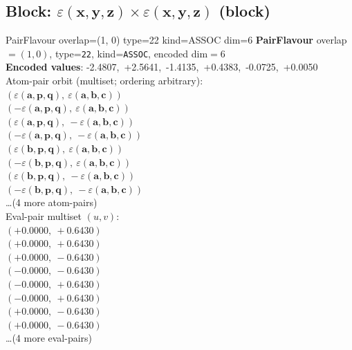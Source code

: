 \documentclass[a4paper,11pt]{article}
\newcommand{\kblbmcpggoncpf}[3]{\varepsilon(\mathbf{#1},\mathbf{#2},\mathbf{#3})}
\begin{document}
\subsection{Block: $\kblbmcpggoncpf{x}{y}{z} \times \kblbmcpggoncpf{x}{y}{z}$  (block)}
    PairFlavour  overlap=(1, 0)  type=22  kind=ASSOC  dim=6
\textbf{PairFlavour} overlap$=(1, 0)$, type=\texttt{22}, kind=\texttt{ASSOC}, encoded dim$=6$\\
\textbf{      Encoded values}: -2.4807,\ +2.5641,\ -1.4135,\ +0.4383,\ -0.0725,\ +0.0050\\
\quad Atom-pair orbit (multiset; ordering arbitrary):\\
$(\kblbmcpggoncpf{a}{p}{q},\ \kblbmcpggoncpf{a}{b}{c})$\\
$(-\kblbmcpggoncpf{a}{p}{q},\ \kblbmcpggoncpf{a}{b}{c})$\\
$(\kblbmcpggoncpf{a}{p}{q},\ -\kblbmcpggoncpf{a}{b}{c})$\\
$(-\kblbmcpggoncpf{a}{p}{q},\ -\kblbmcpggoncpf{a}{b}{c})$\\
$(\kblbmcpggoncpf{b}{p}{q},\ \kblbmcpggoncpf{a}{b}{c})$\\
$(-\kblbmcpggoncpf{b}{p}{q},\ \kblbmcpggoncpf{a}{b}{c})$\\
$(\kblbmcpggoncpf{b}{p}{q},\ -\kblbmcpggoncpf{a}{b}{c})$\\
$(-\kblbmcpggoncpf{b}{p}{q},\ -\kblbmcpggoncpf{a}{b}{c})$\\
\quad \ldots (4 more atom-pairs)\\
\quad Eval-pair multiset $(u, v)$:\\
$(+0.0000,\ +0.6430)$\\
$(+0.0000,\ +0.6430)$\\
$(+0.0000,\ -0.6430)$\\
$(-0.0000,\ -0.6430)$\\
$(-0.0000,\ +0.6430)$\\
$(-0.0000,\ +0.6430)$\\
$(+0.0000,\ -0.6430)$\\
$(+0.0000,\ -0.6430)$\\
\quad \ldots (4 more eval-pairs)\\
\end{document}
